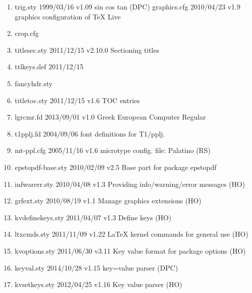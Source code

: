 \begin{enumerate}
\item trig.sty 1999/03/16 v1.09 sin cos tan (DPC)
graphics.cfg 2010/04/23 v1.9 graphics configuration of TeX Live
\item crop.cfg
\item titlesec.sty 2011/12/15 v2.10.0 Sectioning titles
\item ttlkeys.def 2011/12/15
\item fancyhdr.sty 
\item titletoc.sty 2011/12/15 v1.6 TOC entries
\item lgrcmr.fd 2013/09/01 v1.0 Greek European Computer Regular
\item t1pplj.fd 2004/09/06 font definitions for T1/pplj.
\item mt-ppl.cfg 2005/11/16 v1.6 microtype config. file: Palatino (RS)
\item epstopdf-base.sty 2010/02/09 v2.5 Base part for package epstopdf
\item infwarerr.sty 2010/04/08 v1.3 Providing info/warning/error messages (HO)
\item grfext.sty 2010/08/19 v1.1 Manage graphics extensions (HO)
\item kvdefinekeys.sty 2011/04/07 v1.3 Define keys (HO)
\item ltxcmds.sty 2011/11/09 v1.22 LaTeX kernel commands for general use (HO)
\item kvoptions.sty 2011/06/30 v3.11 Key value format for package options (HO)
\item keyval.sty 2014/10/28 v1.15 key=value parser (DPC)
\item kvsetkeys.sty 2012/04/25 v1.16 Key value parser (HO)

\end{enumerate}
